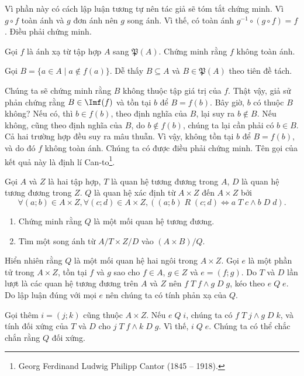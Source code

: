 \stepSubexercise Vì phần này có cách lập luận tương tự nên tác giả sẽ tóm tắt chứng minh. Vì $g \circ f$ toàn ánh và $g$ đơn ánh nên $g$ song ánh. Vì thế, có toàn ánh $g^{-1} \circ (g \circ f) = f$. Điều phải chứng minh.

\exercise Gọi $f$ là ánh xạ từ tập hợp $A$ sang $\mathfrak{P}(A)$. Chứng minh rằng $f$ không toàn ánh.

\solution 

Gọi $B = \{a \in A \mid a \notin f(a)\}$. Dễ thấy $B \subseteq A$ và $B \in \mathfrak{P}(A)$ theo tiên đề tách. 

Chúng ta sẽ chứng minh rằng $B$ không thuộc tập giá trị của $f$. Thật vậy, giả sử phản chứng rằng $B \in \Imf(f)$ và tồn tại $b$ để $B = f(b)$. Bây giờ, $b$ có thuộc $B$ không? Nếu có, thì $b \in f(b)$, theo định nghĩa của $B$, lại suy ra $b \notin B$. Nếu không, cũng theo định nghĩa của $B$, do $b \notin f(b)$, chúng ta lại cần phải có $b \in B$. Cả hai trường hợp đều suy ra mâu thuẫn. Vì vậy, không tồn tại $b$ để $B = f(b)$, và do đó $f$ không toàn ánh. Chúng ta có được điều phải chứng minh. Tên gọi của kết quả này là định lí Can-to\footnote{Georg Ferdinand Ludwig Philipp Cantor (1845 -- 1918).}.

\exercise Gọi $A$ và $Z$ là hai tập hợp, $T$ là quan hệ tương đương trong $A$, $D$ là quan hệ tương đương trong $Z$. $Q$ là quan hệ xác định từ $A \times Z$ đến $A \times Z$ bởi
\begin{equation*}
   \forall (a; b) \in A \times Z, \forall (c; d) \in A \times Z, \left((a; b)\;R\;(c; d) \iff a\;T\;c \land b\;D\;d\right).
\end{equation*}
\begin{enumerate}
   \item Chứng minh rằng $Q$ là một mối quan hệ tương đương.
   \item Tìm một song ánh từ $A/T \times Z/D$ vào $(A \times B)/Q$.
\end{enumerate}

\solution 

\resetSubexercise Hiển nhiên rằng $Q$ là một mối quan hệ hai ngôi trong $A \times Z$. Gọi $e$ là một phần tử trong $A \times Z$, tồn tại $f$ và $g$ sao cho $f \in A$, $g \in Z$ và $e = (f; g)$. Do $T$ và $D$ lần lượt là các quan hệ tương đương trên $A$ và $Z$ nên $f\;T\;f \land g\;D\;g$, kéo theo $e\;Q\;e$. Do lập luận đúng với mọi $e$ nên chúng ta có tính phản xạ của $Q$.

Gọi thêm $i = (j; k)$ cũng thuộc $A \times Z$. Nếu $e\;Q\;i$, chúng ta có $f\;T\;j\land g\;D\;k$, và tính đối xứng của $T$ và $D$ cho $j\;T\;f\land k\;D\;g$. Vì thế, $i\;Q\;e$. Chúng ta có thể chắc chắn rằng $Q$ đối xứng.

